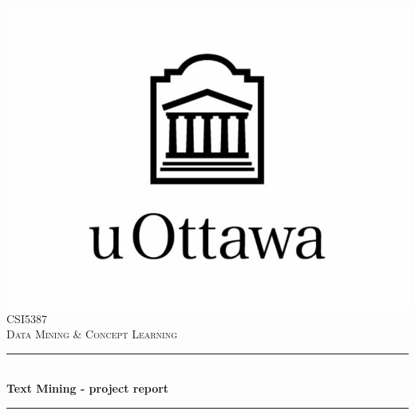 \documentclass[10pt]{article}
\begin{document}
\begin{titlepage}
\newcommand{\HRule}{\rule{\linewidth}{0.1mm}} 
\center %

\includegraphics[width=.5\linewidth]{uottawa_logo.jpg}\\[0.5cm] 
\textsc{\Large CSI5387}\\[0.5cm] %
\textsc{\Large Data Mining \& Concept Learning}\\[0.5cm] %

\HRule \\[0.4cm]
{\huge\bfseries Text Mining - project report}\\[0.1cm] %
\HRule \\[1.5cm]
 


\end{titlepage}
\end{document}
